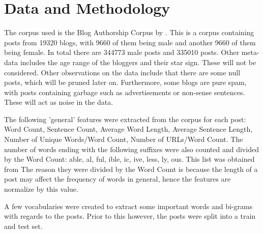 \section{Data and Methodology}

The corpus used is the Blog Authorship Corpus by \cite{2}. This is a corpus containing posts from 19320 blogs, with 9660 of them being male and another 9660 of them being female. In total there are 344773 male posts and 335010 posts. Other meta-data includes the age range of the bloggers and their star sign. These will not be considered. Other observations on the data include that there are some null posts, which will be pruned later on. Furthermore, some blogs are pure spam, with posts containing garbage such as advertisements or non-sense sentences. These will act as noise in the data. 

The following 'general' features were extracted from the corpus for each post: Word Count, Sentence Count, Average Word Length, Average Sentence Length, Number of Unique Words/Word Count, Number of URLs/Word Count. The number of words ending with the following suffixes were also counted and divided by the Word Count: able, al, ful, ible, ic, ive, less, ly, ous. This list was obtained from \cite{4} The reason they were divided by the Word Count is because the length of a post may affect the frequency of words in general, hence the features are normalize by this value.

A few vocabularies were created to extract some important words and bi-grams with regards to the posts. Prior to this however, the posts were split into a train and test set.


